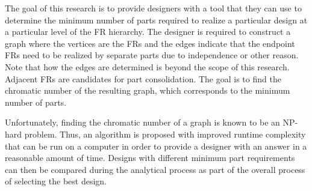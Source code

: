 The goal of this research is to provide designers with a tool that they can use to determine the minimum number of
parts required to realize a particular design at a particular level of the FR hierarchy.  The designer is required
to construct a graph where the vertices are the FRs and the edges indicate that the endpoint FRs need to be
realized by separate parts due to independence or other reason.  Note that how the edges are determined is beyond
the scope of this research.  Adjacent FRs are candidates for part consolidation.  The goal is to find the chromatic
number of the resulting graph, which corresponds to the minimum number of parts.

Unfortunately, finding the chromatic number of a graph is known to be an NP-hard problem.  Thus, an algorithm is
proposed with improved runtime complexity that can be run on a computer in order to provide a designer with an
answer in a reasonable amount of time.  Designs with different minimum part requirements can then be compared
during the analytical process as part of the overall process of selecting the best design.
